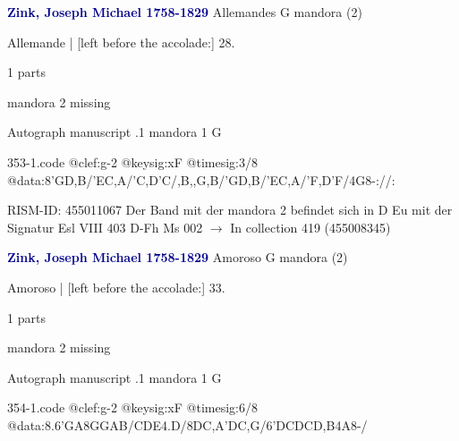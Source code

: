 \documentclass[twocolumn]{book}
\begin{document}
\newline \par \vspace{7pt} \textcolor{darkblue}{\textbf{Zink, Joseph Michael  1758-1829}}
\newline Allemandes  G  
\newline mandora (2)
\newline \begin{itshape}[f.17r, at left:] Allemande | [left before the accolade:] 28.\end{itshape} 
\newline \textcolor{darkblue}{}  1 parts  
\newline \begin{small} mandora 2 missing\end{small} 
\newline Autograph manuscript
.1  mandora 1  G  
\begin{filecontents*}{353-1.code}
@clef:g-2
@keysig:xF
@timesig:3/8
@data:8'GD,B/'EC,A/'C,D'C/,B,,G,B/'GD,B/'EC,A/'F,D'F/4G8-://:
\end{filecontents*}
\newline
%

\newline RISM-ID: 455011067
\newline Der Band mit der mandora 2 befindet sich in D Eu mit der Signatur Esl VIII 403
\newline D-Fh  Ms 002
\newline $\rightarrow$ In collection 419 (455008345)

\newline \par \vspace{7pt} \textcolor{darkblue}{\textbf{Zink, Joseph Michael  1758-1829}}
\newline Amoroso  G  
\newline mandora (2)
\newline \begin{itshape}[f.19v, at left:] Amoroso | [left before the accolade:] 33.\end{itshape} 
\newline \textcolor{darkblue}{}  1 parts  
\newline \begin{small} mandora 2 missing\end{small} 
\newline Autograph manuscript
.1  mandora 1  G  
\begin{filecontents*}{354-1.code}
@clef:g-2
@keysig:xF
@timesig:6/8
@data:{8.6'GA8G}{GAB}/{CDE}4.D/{8DC,A}{'DC,G}/{6'DCDCD,B}4A8-/
\end{filecontents*}
\newline
%
\end{document}
